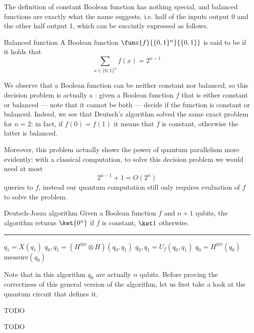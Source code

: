 \documentclass[a4paper, 12pt]{report}
\begin{document}
The definition of constant Boolean function has nothing special, and balanced functions are exactly what the name suggests, i.e. half of the inputs output 0 and the other half output 1, which can be succintly expressed as follows.

\begin{frameddefn}{Balanced function}
    A Boolean function $\func{f}{\{0, 1\}^n}{\{0,1\}}$ is said to be  if it holds that $$\sum_{x \in \{0, 1\}^n}{f(x)} = 2^{n - 1}$$
\end{frameddefn}

We observe that a Boolean function can be neither constant nor balanced, so this decision problem is actually a : given a Boolean function $f$ that is either constant or balanced --- note that it cannot be both --- decide if the function is constant or balanced. Indeed, we see that Deutsch's algorithm solved the same exact problem for $n = 2$: in fact, if $f(0) = f(1)$ it means that $f$ is constant, otherwise the latter is balanced.

Moreover, this problem actually shows the power of quantum parallelism more evidently: with a classical computation, to solve this decision problem we would need at most $$2^{n - 1} + 1 = O(2^n)$$ queries to $f$, instead our quantum computation still only requires  evaluation of $f$ to solve the problem.

\begin{framedalgo}{Deutsch-Josza algorithm}
    Given a Boolean function $f$ and $n + 1$ qubits, the algorithm returns $\ket{0^n}$ if $f$ is constant, $\ket 1$ otherwise. \\
    \hrule

    \quad
    \begin{algorithmic}[1]
            \State $q_1 = X(q_1)$
            \State $q_0, q_1 = (H^{\otimes n} \otimes H)(q_0, q_1)$
            \State $q_0, q_1 = U_f(q_0, q_1)$
            \State $q_0 = H^{\otimes n}(q_0)$
            \State {} $\mbox{measure}(q_0)$
        \EndFunction
    \end{algorithmic}
\end{framedalgo}

Note that in this algorithm $q_0$ are actually $n$ qubits. Before proving the correctness of this general version of the algorithm, let us first take a look at the quantum circuit that defines it.

TODO 

TODO 

\printbibliography %
\end{document}
